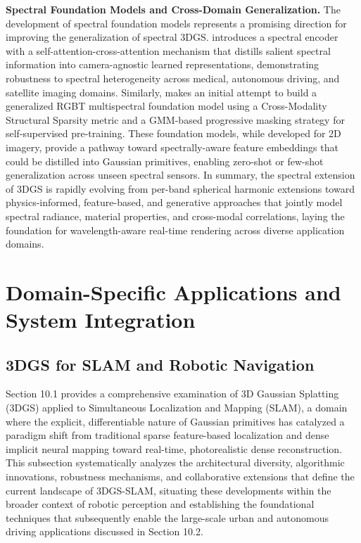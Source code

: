 \documentclass[11pt]{article}
\begin{document}
\textbf{Spectral Foundation Models and Cross-Domain Generalization.} The development of spectral foundation models represents a promising direction for improving the generalization of spectral 3DGS. \cite{ref630} introduces a spectral encoder with a self-attention-cross-attention mechanism that distills salient spectral information into camera-agnostic learned representations, demonstrating robustness to spectral heterogeneity across medical, autonomous driving, and satellite imaging domains. Similarly, \cite{ref631} makes an initial attempt to build a generalized RGBT multispectral foundation model using a Cross-Modality Structural Sparsity metric and a GMM-based progressive masking strategy for self-supervised pre-training. These foundation models, while developed for 2D imagery, provide a pathway toward spectrally-aware feature embeddings that could be distilled into Gaussian primitives, enabling zero-shot or few-shot generalization across unseen spectral sensors. In summary, the spectral extension of 3DGS is rapidly evolving from per-band spherical harmonic extensions toward physics-informed, feature-based, and generative approaches that jointly model spectral radiance, material properties, and cross-modal correlations, laying the foundation for wavelength-aware real-time rendering across diverse application domains.

\section{Domain-Specific Applications and System Integration}

\subsection{3DGS for SLAM and Robotic Navigation}

Section 10.1 provides a comprehensive examination of 3D Gaussian Splatting (3DGS) applied to Simultaneous Localization and Mapping (SLAM), a domain where the explicit, differentiable nature of Gaussian primitives has catalyzed a paradigm shift from traditional sparse feature-based localization and dense implicit neural mapping toward real-time, photorealistic dense reconstruction. This subsection systematically analyzes the architectural diversity, algorithmic innovations, robustness mechanisms, and collaborative extensions that define the current landscape of 3DGS-SLAM, situating these developments within the broader context of robotic perception and establishing the foundational techniques that subsequently enable the large-scale urban and autonomous driving applications discussed in Section 10.2.
\end{document}
